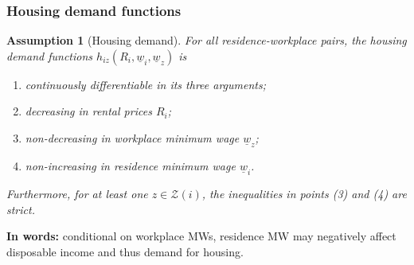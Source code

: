 \documentclass[aspectratio=169, t]{beamer}
\newtheorem{assu}{Assumption}
\newcommand{\Z}{\mathcal{Z}}
\newcommand{\MW}{\underline{w}}
\begin{document}
\begin{frame}
    \frametitle{Housing demand functions}
   
    \begin{assu}[Housing demand]\label{assu:housing_function}
        For all residence-workplace pairs, the housing demand functions $h_{iz} (R_i, \MW_i, \MW_z)$ is
        \begin{enumerate}
            \item continuously differentiable in its three arguments;
            \item decreasing in rental prices $R_i$;
            \item non-decreasing in workplace minimum wage $\MW_z$;
            \item non-increasing in residence minimum wage $\MW_i$.
        \end{enumerate}
        Furthermore, for at least one $z\in\Z(i)$, the inequalities in points (3)
        and (4) are strict.
    \end{assu}

    \pause 
    \vspace{2mm}

    \textbf{In words:} conditional on workplace MWs, residence MW may negatively affect disposable income
    and thus demand for housing.
\end{frame}
\end{document}
